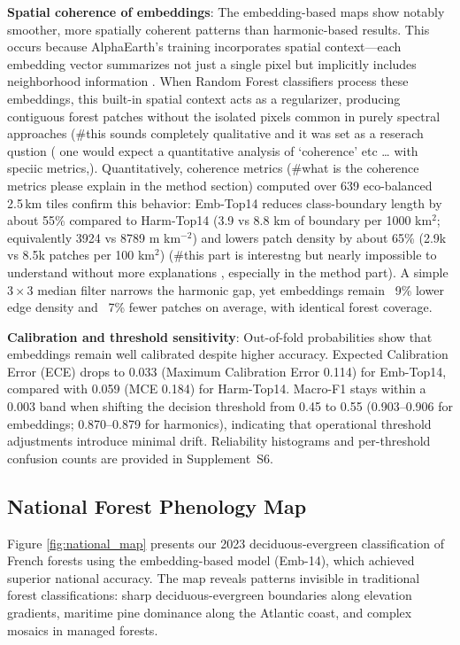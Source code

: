 \documentclass[utf8]{FrontiersinHarvard}
\begin{document}
\textbf{Spatial coherence of embeddings}: The embedding-based maps show notably smoother, more spatially coherent patterns than harmonic-based results. This occurs because AlphaEarth's training incorporates spatial context—each embedding vector summarizes not just a single pixel but implicitly includes neighborhood information \citep{AlphaEarth2025}. When Random Forest classifiers process these embeddings, this built-in spatial context acts as a regularizer, producing contiguous forest patches without the isolated pixels common in purely spectral approaches (#this sounds completely qualitative and it was set as a reserach qustion ( one would expect a quantitative analysis of ‘coherence’ etc … with speciic metrics,). Quantitatively, coherence metrics (#what is the coherence metrics please explain in the method section) computed over 639 eco-balanced 2.5\,km tiles confirm this behavior: Emb-Top14 reduces class-boundary length by about 55\% compared to Harm-Top14 (3.9 vs 8.8 km of boundary per 1000 km$^2$; equivalently 3924 vs 8789 m km$^{-2}$) and lowers patch density by about 65\% (2.9k vs 8.5k patches per 100 km$^2$) (#this part is interestng but nearly impossible to understand without more explanations , especially in the method part). A simple 3\,$\times$\,3 median filter narrows the harmonic gap, yet embeddings remain ~9\% lower edge density and ~7\% fewer patches on average, with identical forest coverage.

\textbf{Calibration and threshold sensitivity}: Out-of-fold probabilities show that embeddings remain well calibrated despite higher accuracy. Expected Calibration Error (ECE) drops to 0.033 (Maximum Calibration Error 0.114) for Emb-Top14, compared with 0.059 (MCE 0.184) for Harm-Top14. Macro-F1 stays within a 0.003 band when shifting the decision threshold from 0.45 to 0.55 (0.903–0.906 for embeddings; 0.870–0.879 for harmonics), indicating that operational threshold adjustments introduce minimal drift. Reliability histograms and per-threshold confusion counts are provided in Supplement~S6.


\subsection{National Forest Phenology Map} %

Figure \ref{fig:national_map} presents our 2023 deciduous-evergreen classification of French forests using the embedding-based model (Emb-14), which achieved superior national accuracy. The map reveals patterns invisible in traditional forest classifications: sharp deciduous-evergreen boundaries along elevation gradients, maritime pine dominance along the Atlantic coast, and complex mosaics in managed forests.
\end{document}
